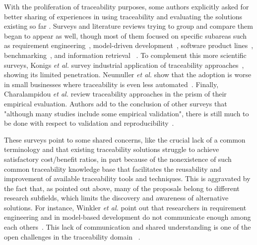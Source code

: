 With the proliferation of traceability purposes, some authors explicitly asked for better sharing of experiences in using traceability \cite{Gotel2012} and evaluating the solutions existing so far \cite{shin2015-guidelines-benchmark-auto-traceability}. Surveys and literature reviews trying to group and compare them began to appear as well, though most of them focused on specific subareas such as requirement engineering~\cite{gotel1994,bouillon2013-survey-on-usage-scenario-requirements-traceability-in-practice}, model-driven development~\cite{galvao2007-survey-traceability-in-MDE,winkler2010-survey-traceability-and-MDE,paige2010-MDE-Traceability-classifications,santiago2012-MDE-as-a-new-landscape-for-traceability-SLR,mustafa2017-literature-review}, software product lines~\cite{vale2017-SPL-traceability-a-sms,anquetil2010-model-driven-tracea-for-SPL}, benchmarking~\cite{shin2015-guidelines-benchmark-auto-traceability}, and information retrieval ~\cite{delucia2012-information-retrieval-for-traceability,borg2014-SmS-IR-for-traceability,guo2017-semantically-enhanced-tracebility-deep-learning}. To complement this more scientific surveys, Konigs \textit{et al.} survey industrial application of traceability approaches~\cite{konigs2012-industry-systems-engineering}, showing its limited penetration. Neumuller \textit{et al.} show that the adoption is worse in small businesses where traceability is even less automated~\cite{neumuller2006-industry-small-companies-case-study}. Finally, Charalampidou \textit{et al.} review traceability approaches in the prism of their empirical evaluation. Authors add to the conclusion of other surveys that "although many studies include some empirical validation", there is still much to be done with respect to validation and reproducibility~\cite{charalampidou2020-mapping-study}.

These surveys point to some shared concerns, like the crucial lack of a common terminology and that existing traceability solutions struggle to achieve satisfactory cost/benefit ratios, in part because of the nonexistence of such common traceability knowledge base that facilitates the reusability and improvement of available traceability tools and techniques. This is aggravated by the fact that, as pointed out above, many of the proposals belong to different research subfields, which limits the discovery and awareness of alternative solutions. For instance, Winkler \textit{et al.} point out that researchers in requirement engineering and in model-based development do not communicate enough among each others~\cite{winkler2010-survey-traceability-and-MDE}. This lack of communication and shared understanding is one of the open challenges in the traceability domain ~\cite{clelandhuang2014-traceability-trends-and-futurte-direction,antoniol2017-traceability-grand-challenges}.

